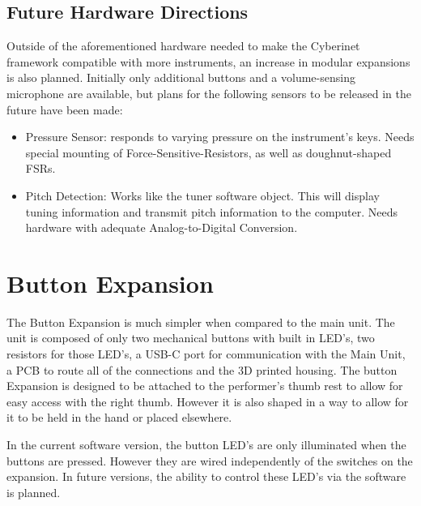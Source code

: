 

\subsection{Future Hardware Directions}
Outside of the aforementioned hardware needed to make the Cyberinet framework compatible with more instruments, an increase in modular expansions is also planned. Initially only additional buttons and a volume-sensing microphone are available, but plans for the following sensors to be released in the future have been made:

\begin{itemize}
    \item Pressure Sensor: responds to varying pressure on the instrument's keys. Needs special mounting of Force-Sensitive-Resistors, as well as doughnut-shaped FSRs.
    \item Pitch Detection: Works like the tuner software object. This will display tuning information and transmit pitch information to the computer. Needs hardware with adequate Analog-to-Digital Conversion.
\end{itemize}

\section{Button Expansion}

The Button Expansion is much simpler when compared to the main unit. The unit is composed of only two mechanical buttons with built in LED's, two resistors for those LED's, a USB-C port for communication with the Main Unit, a PCB to route all of the connections and the 3D printed housing. The button Expansion is designed to be attached to the performer's thumb rest to allow for easy access with the right thumb. However it is also shaped in a way to allow for it to be held in the hand or placed elsewhere.

In the current software version, the button LED's are only illuminated when the buttons are pressed. However they are wired independently of the switches on the expansion. In future versions, the ability to control these LED's via the software is planned.








